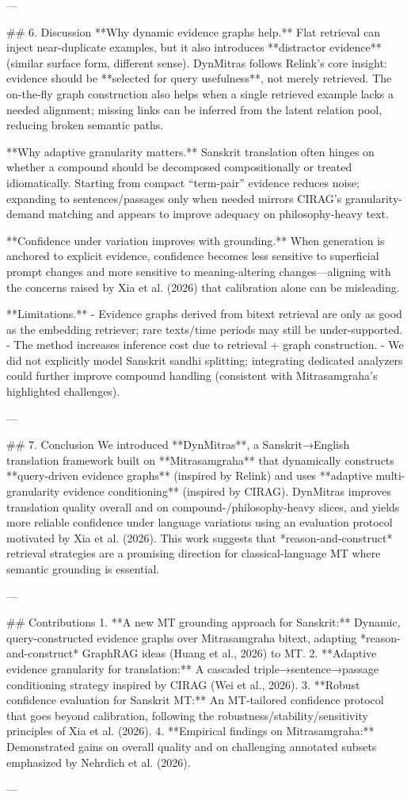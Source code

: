 ---

## 6. Discussion  
**Why dynamic evidence graphs help.** Flat retrieval can inject near-duplicate examples, but it also introduces **distractor evidence** (similar surface form, different sense). DynMitras follows Relink’s core insight: evidence should be **selected for query usefulness**, not merely retrieved. The on-the-fly graph construction also helps when a single retrieved example lacks a needed alignment; missing links can be inferred from the latent relation pool, reducing broken semantic paths.

**Why adaptive granularity matters.** Sanskrit translation often hinges on whether a compound should be decomposed compositionally or treated idiomatically. Starting from compact “term-pair” evidence reduces noise; expanding to sentences/passages only when needed mirrors CIRAG’s granularity-demand matching and appears to improve adequacy on philosophy-heavy text.

**Confidence under variation improves with grounding.** When generation is anchored to explicit evidence, confidence becomes less sensitive to superficial prompt changes and more sensitive to meaning-altering changes—aligning with the concerns raised by Xia et al. (2026) that calibration alone can be misleading.

**Limitations.**  
- Evidence graphs derived from bitext retrieval are only as good as the embedding retriever; rare texts/time periods may still be under-supported.  
- The method increases inference cost due to retrieval + graph construction.  
- We did not explicitly model Sanskrit sandhi splitting; integrating dedicated analyzers could further improve compound handling (consistent with Mitrasamgraha’s highlighted challenges).

---

## 7. Conclusion  
We introduced **DynMitras**, a Sanskrit→English translation framework built on **Mitrasamgraha** that dynamically constructs **query-driven evidence graphs** (inspired by Relink) and uses **adaptive multi-granularity evidence conditioning** (inspired by CIRAG). DynMitras improves translation quality overall and on compound-/philosophy-heavy slices, and yields more reliable confidence under language variations using an evaluation protocol motivated by Xia et al. (2026). This work suggests that *reason-and-construct* retrieval strategies are a promising direction for classical-language MT where semantic grounding is essential.

---

## Contributions  
1. **A new MT grounding approach for Sanskrit:** Dynamic, query-constructed evidence graphs over Mitrasamgraha bitext, adapting *reason-and-construct* GraphRAG ideas (Huang et al., 2026) to MT.  
2. **Adaptive evidence granularity for translation:** A cascaded triple→sentence→passage conditioning strategy inspired by CIRAG (Wei et al., 2026).  
3. **Robust confidence evaluation for Sanskrit MT:** An MT-tailored confidence protocol that goes beyond calibration, following the robustness/stability/sensitivity principles of Xia et al. (2026).  
4. **Empirical findings on Mitrasamgraha:** Demonstrated gains on overall quality and on challenging annotated subsets emphasized by Nehrdich et al. (2026).

---